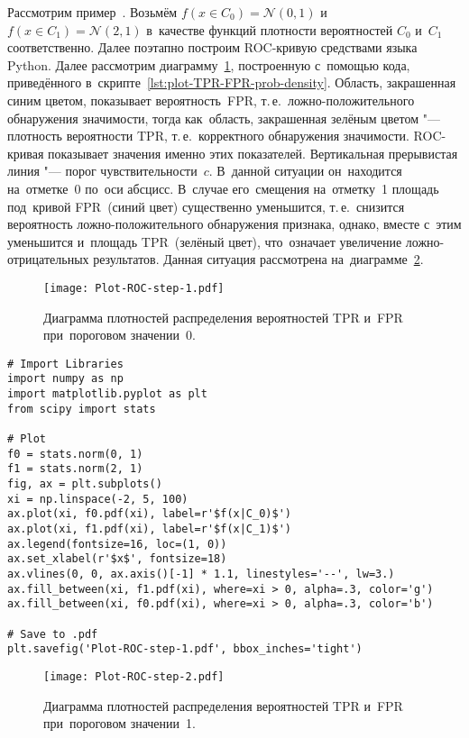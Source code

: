 \documentclass[]{scrreprt}
\begin{document}
Рассмотрим пример~\cite{AUC-Derivation}.  Возьмём  $f(x\in C_{0}) = \mathcal{N}(0,1)$ и~$f(x\in C_{1}) = \mathcal{N}(2,1)$ в~качестве функций плотности вероятностей $C_{0}$ и~$C_{1}$ соответственно. Далее поэтапно построим ROC-кривую средствами языка Python. Далее рассмотрим диаграмму~\ref{fig:plot-TPR-FPR-prob-density-1}, построенную с~помощью кода, приведённого в~скрипте~\ref{lst:plot-TPR-FPR-prob-density}. Область, закрашенная синим цветом, показывает вероятность~FPR, т.\,е.~ложно-положительного обнаружения значимости, тогда как~область, закрашенная зелёным цветом "--- плотность вероятности TPR, т.\,е.~корректного обнаружения значимости. ROC-кривая показывает значения именно этих показателей. Вертикальная прерывистая линия "--- порог чувствительности~$c$. В~данной ситуации он~находится на~отметке~0 по~оси абсцисс. В~случае его~смещения на~отметку~1 площадь под~кривой FPR~(синий цвет) существенно уменьшится, т.\,е.~снизится вероятность ложно-положительного обнаружения признака, однако, вместе с~этим уменьшится и~площадь TPR~(зелёный цвет), что~означает увеличение ложно-отрицательных результатов. Данная ситуация рассмотрена на~диаграмме~\ref{fig:plot-TPR-FPR-prob-density-2}.  
%
\begin{figure}[ht]
	\centering
	\texttt{[image: Plot-ROC-step-1.pdf]}
	\caption{Диаграмма плотностей распределения вероятностей TPR и~FPR при~пороговом значении~0.}
	\label{fig:plot-TPR-FPR-prob-density-1}
\end{figure}
%
\begin{lstlisting}[float, caption = Построение диаграммы плотностей распределения вероятностей TPR и~FPR, firstnumber=1, label= lst:plot-TPR-FPR-prob-density]
# Import Libraries
import numpy as np
import matplotlib.pyplot as plt
from scipy import stats

# Plot
f0 = stats.norm(0, 1)
f1 = stats.norm(2, 1)
fig, ax = plt.subplots()
xi = np.linspace(-2, 5, 100)
ax.plot(xi, f0.pdf(xi), label=r'$f(x|C_0)$')
ax.plot(xi, f1.pdf(xi), label=r'$f(x|C_1)$')
ax.legend(fontsize=16, loc=(1, 0))
ax.set_xlabel(r'$x$', fontsize=18)
ax.vlines(0, 0, ax.axis()[-1] * 1.1, linestyles='--', lw=3.)
ax.fill_between(xi, f1.pdf(xi), where=xi > 0, alpha=.3, color='g')
ax.fill_between(xi, f0.pdf(xi), where=xi > 0, alpha=.3, color='b')

# Save to .pdf
plt.savefig('Plot-ROC-step-1.pdf', bbox_inches='tight')
\end{lstlisting}
%
\begin{figure}[ht]
	\centering
	\texttt{[image: Plot-ROC-step-2.pdf]}
	\caption{Диаграмма плотностей распределения вероятностей TPR и~FPR при~пороговом значении~1.}
	\label{fig:plot-TPR-FPR-prob-density-2}
\end{figure}
%
\end{document}
